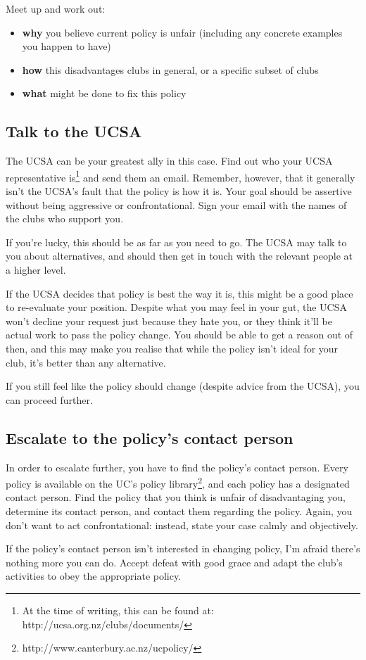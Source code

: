 Meet up and work out:

\begin{itemize}
  \item \textbf{why} you believe current policy is unfair (including any concrete examples you happen to have)
  \item \textbf{how} this disadvantages clubs in general, or a specific subset of clubs
  \item \textbf{what} might be done to fix this policy
\end{itemize}

\subsection{Talk to the UCSA}

The UCSA can be your greatest ally in this case. Find out who your UCSA representative is\footnote{At the time of writing, this can be found at: http://ucsa.org.nz/clubs/documents/} and send them an email. Remember, however, that it generally isn't the UCSA's fault that the policy is how it is. Your goal should be assertive without being aggressive or confrontational. Sign your email with the names of the clubs who support you.

If you're lucky, this should be as far as you need to go. The UCSA may talk to you about alternatives, and should then get in touch with the relevant people at a higher level.

If the UCSA decides that policy is best the way it is, this might be a good place to re-evaluate your position. Despite what you may feel in your gut, the UCSA won't decline your request just because they hate you, or they think it'll be actual work to pass the policy change. You should be able to get a reason out of then, and this may make you realise that while the policy isn't ideal for your club, it's better than any alternative.

If you still feel like the policy should change (despite advice from the UCSA), you can proceed further.

\subsection{Escalate to the policy's contact person}

In order to escalate further, you have to find the policy's contact person. Every policy is available on the UC's policy library\footnote{http://www.canterbury.ac.nz/ucpolicy/}, and each policy has a designated contact person. Find the policy that you think is unfair of disadvantaging you, determine its contact person, and contact them regarding the policy. Again, you don't want to act confrontational: instead, state your case calmly and objectively.

If the policy's contact person isn't interested in changing policy, I'm afraid there's nothing more you can do. Accept defeat with good grace and adapt the club's activities to obey the appropriate policy.